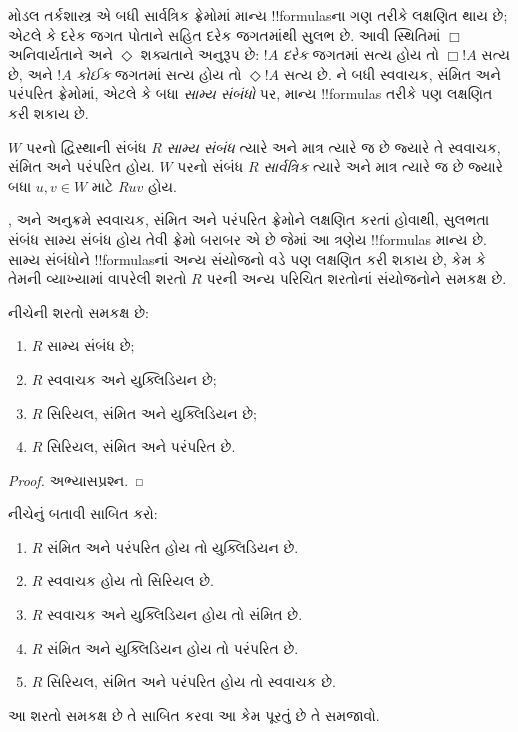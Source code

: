 \documentclass[../../../include/open-logic-section]{subfiles}
\begin{document}


મોડલ તર્કશાસ્ત્ર  એ બધી સાર્વત્રિક ફ્રેમોમાં
માન્ય !!{formula}sના ગણ તરીકે લક્ષણિત થાય છે;
એટલે કે દરેક જગત પોતાને સહિત દરેક જગતમાંથી
સુલભ છે. આવી સ્થિતિમાં $\Box$ અનિવાર્યતાને
અને $\Diamond$ શક્યતાને અનુરૂપ છે: $!A$ \emph{દરેક}
જગતમાં સત્ય હોય તો $\Box !A$ સત્ય છે, અને $!A$
\emph{કોઈક} જગતમાં સત્ય હોય તો $\Diamond !A$
સત્ય છે. ને બધી સ્વવાચક, સંમિત અને
પરંપરિત ફ્રેમોમાં, એટલે કે બધા \emph{સામ્ય સંબંધો}
પર, માન્ય !!{formula}s તરીકે પણ લક્ષણિત કરી શકાય છે.

\begin{defn}
  $W$ પરનો દ્વિસ્થાની સંબંધ $R$ \emph{સામ્ય સંબંધ}
  ત્યારે અને માત્ર ત્યારે જ છે જ્યારે તે સ્વવાચક,
  સંમિત અને પરંપરિત હોય. $W$ પરનો સંબંધ $R$
  \emph{સાર્વત્રિક} ત્યારે અને માત્ર ત્યારે જ છે જ્યારે
  બધા $u,v \in
  W$ માટે $Ruv$ હોય.
\end{defn}

,  અને  અનુક્રમે સ્વવાચક,
સંમિત અને પરંપરિત ફ્રેમોને લક્ષણિત કરતાં હોવાથી,
સુલભતા સંબંધ સામ્ય સંબંધ હોય તેવી ફ્રેમો બરાબર
એ છે જેમાં આ ત્રણેય !!{formula}s માન્ય છે.
સામ્ય સંબંધોને !!{formula}sનાં અન્ય સંયોજનો વડે
પણ લક્ષણિત કરી શકાય છે, કેમ કે તેમની વ્યાખ્યામાં
વાપરેલી શરતો $R$ પરની અન્ય પરિચિત શરતોનાં
સંયોજનોને સમકક્ષ છે.

\begin{prop}
  નીચેની શરતો સમકક્ષ છે:
  \begin{enumerate}
  \item $R$ સામ્ય સંબંધ છે;
  \item $R$ સ્વવાચક અને યુક્લિડિયન છે;
  \item $R$ સિરિયલ, સંમિત અને યુક્લિડિયન છે;
  \item $R$ સિરિયલ, સંમિત અને પરંપરિત છે.
  \end{enumerate}
\end{prop}

\begin{proof}
  અભ્યાસપ્રશ્ન.
\end{proof}

\begin{prob}
  નીચેનું બતાવી 
  સાબિત કરો:
  \begin{enumerate}
  \item $R$ સંમિત અને પરંપરિત હોય તો યુક્લિડિયન છે.
  \item $R$ સ્વવાચક હોય તો સિરિયલ છે.
  \item $R$ સ્વવાચક અને યુક્લિડિયન હોય તો સંમિત છે.
  \item $R$ સંમિત અને યુક્લિડિયન હોય તો પરંપરિત છે.
  \item $R$ સિરિયલ, સંમિત અને પરંપરિત હોય તો સ્વવાચક છે.
  \end{enumerate}
  આ શરતો સમકક્ષ છે તે સાબિત કરવા આ કેમ પૂરતું છે
  તે સમજાવો.
\end{prob}
\end{document}
